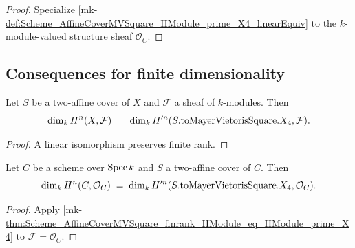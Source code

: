 \begin{proof}
  \leanok


Specialize \ref{mk-def:Scheme_AffineCoverMVSquare_HModule_prime_X4_linearEquiv} to the \(k\)-module-valued structure sheaf \(\mathcal O_C\).
\end{proof}

\subsection{Consequences for finite dimensionality}

\begin{theorem}\label{mk-thm:Scheme_AffineCoverMVSquare_finrank_HModule_eq_HModule_prime_X4}
  \leanok


  Let \(S\) be a two-affine cover of \(X\) and \(\mathcal F\) a sheaf of \(k\)-modules. Then
  \[
    \dim_k H^{n}(X, \mathcal F) \;=\; \dim_k H^{\prime n}(S.\mathrm{toMayerVietorisSquare}.X_4, \mathcal F).
  \]
\end{theorem}

\begin{proof}
  \leanok


A linear isomorphism preserves finite rank.
\end{proof}

\begin{theorem}\label{mk-thm:Scheme_AffineCoverMVSquare_finrank_HModule_eq_HModule_prime_X4_curve}
  \leanok


  Let \(C\) be a scheme over \(\operatorname{Spec} k\) and \(S\) a two-affine cover of \(C\). Then
  \[
    \dim_k H^{n}(C, \mathcal O_C) \;=\; \dim_k H^{\prime n}(S.\mathrm{toMayerVietorisSquare}.X_4, \mathcal O_C).
  \]
\end{theorem}

\begin{proof}
  \leanok


Apply \ref{mk-thm:Scheme_AffineCoverMVSquare_finrank_HModule_eq_HModule_prime_X4} to \(\mathcal F=\mathcal O_C\).
\end{proof}

